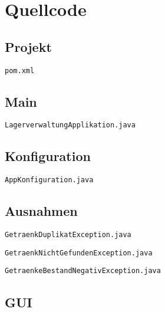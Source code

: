 \chapter{Quellcode}

\section{Projekt}

\verb|pom.xml|



\section{Main}

\verb|LagerverwaltungApplikation.java|



\section{Konfiguration}

\verb|AppKonfiguration.java|



\section{Ausnahmen}

\verb|GetraenkDuplikatException.java|



\verb|GetraenkNichtGefundenException.java|



\verb|GetraenkeBestandNegativException.java|



\section{GUI}

